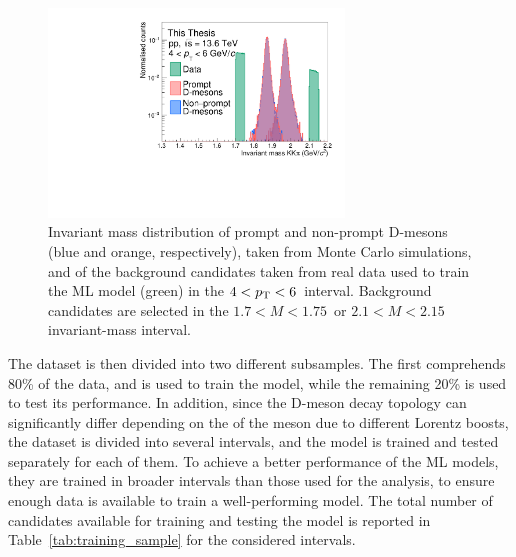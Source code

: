 \begin{figure}[htb]
    \centering
    \includegraphics[width=0.7\textwidth]{Figures/Chapter 5/Mass.pdf}
    \caption{Invariant mass distribution of prompt and non-prompt D-mesons (blue and orange, respectively), taken from Monte Carlo simulations, and of the background candidates taken from real data used to train the ML model (green) in the $4<p_\mathrm{T}<6$~\gevc interval. Background candidates are selected in the $1.7 < M < 1.75$~\gevcc or \mbox{$2.1 < M < 2.15$~\gevcc} invariant-mass interval.}
    \label{fig:ml_training_mass}
\end{figure}

The dataset is then divided into two different subsamples. The first comprehends 80\% of the data, and is used to train the model, while the remaining 20\% is used to test its performance. In addition, since the D-meson decay topology can significantly differ depending on the \pt of the meson due to different Lorentz boosts, the dataset is divided into several \pt intervals, and the model is trained and tested separately for each of them. To achieve a better performance of the ML models, they are trained in broader \pt intervals than those used for the analysis, to ensure enough data is available to train a well-performing model. The total number of candidates available for training and testing the model is reported in Table~\ref{tab:training_sample} for the considered \pt intervals.


